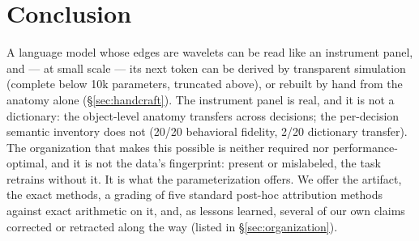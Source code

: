 \documentclass[11pt]{article}
\begin{document}
\section{Conclusion}

A language model whose edges are wavelets can be read like an instrument
panel, and --- at small scale --- its next token can be derived by
transparent simulation (complete below 10k parameters, truncated above),
or rebuilt by hand from the anatomy alone (\S\ref{sec:handcraft}). The
instrument panel is real, and it is not a dictionary: the object-level
anatomy transfers across decisions; the per-decision semantic inventory
does not (20/20 behavioral fidelity, 2/20 dictionary transfer). The organization that makes this possible is
neither required nor performance-optimal, and it is not the data's
fingerprint: present or mislabeled, the task retrains without it. It is
what the parameterization offers. We offer the artifact, the exact
methods, a grading of five standard post-hoc attribution methods against
exact arithmetic on it, and,
as lessons learned, several of
our own claims corrected or retracted along the way (listed in
\S\ref{sec:organization}).
\end{document}

